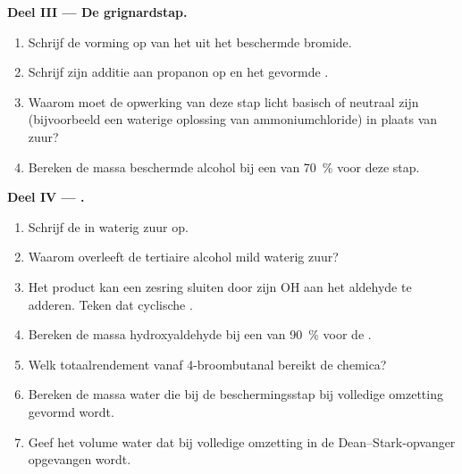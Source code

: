 \begin{problem}
\medskip
\noindent\textbf{Deel III --- De grignardstap.}
\begin{enumerate}[resume]
  \item Schrijf de vorming op van het  uit het beschermde
        bromide.
  \item Schrijf zijn additie aan propanon op en het gevormde .
  \item Waarom moet de opwerking van deze stap licht basisch of neutraal
        zijn (bijvoorbeeld een waterige oplossing van ammoniumchloride) in
        plaats van zuur?
  \item Bereken de massa beschermde alcohol bij een  van
        \qty{70}{\percent} voor deze stap.
\end{enumerate}

\medskip
\noindent\textbf{Deel IV --- .}
\begin{enumerate}[resume]
  \item Schrijf de  in waterig zuur op.
  \item Waarom overleeft de tertiaire alcohol mild waterig zuur?
  \item Het product kan een zesring sluiten door zijn OH aan het aldehyde
        te adderen. Teken dat cyclische .
  \item Bereken de massa hydroxyaldehyde bij een  van
        \qty{90}{\percent} voor de .
  \item Welk totaalrendement vanaf 4-broombutanal bereikt de chemica?
  \item Bereken de massa water die bij de beschermingsstap bij volledige
        omzetting gevormd wordt.
  \item Geef het volume water dat bij volledige omzetting in de
        Dean--Stark-opvanger opgevangen wordt.
\end{enumerate}
\end{problem}
